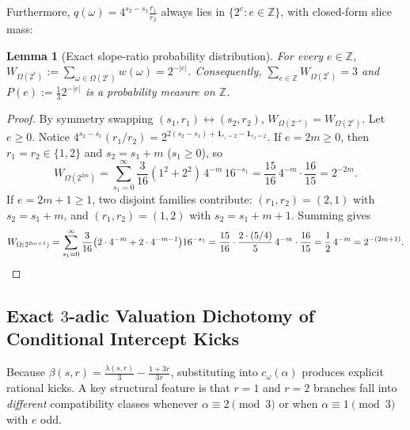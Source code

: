 \documentclass[11pt,a4paper]{article}
\numberwithin{equation}{section}
\newtheorem{lemma}[theorem]{Lemma}
\theoremstyle{definition}
\theoremstyle{remark}
\newcommand{\Z}{\mathbb{Z}}
\begin{document}
Furthermore, $q(\omega) = 4^{s_2 - s_1}\frac{r_1}{r_2}$ always lies in $\{2^e : e \in \Z\}$, with closed-form slice mass:

\begin{lemma}[Exact slope-ratio probability distribution]\label{lem:W_omega_2e}
For every $e \in \Z$, $W_{\Omega(2^e)} := \sum_{\omega \in \Omega(2^e)} w(\omega) = 2^{-|e|}$. Consequently, $\sum_{e \in \Z} W_{\Omega(2^e)} = 3$ and $P(e) := \frac{1}{3} 2^{-|e|}$ is a probability measure on $\Z$.
\end{lemma}

\begin{proof}
By symmetry swapping $(s_1, r_1) \leftrightarrow (s_2, r_2)$, $W_{\Omega(2^{-e})} = W_{\Omega(2^e)}$. Let $e \ge 0$. Notice $4^{s_2-s_1}(r_1/r_2) = 2^{2(s_2-s_1) + \mathbf{1}_{r_1=2} - \mathbf{1}_{r_2=2}}$.
If $e = 2m \ge 0$, then $r_1 = r_2 \in \{1, 2\}$ and $s_2 = s_1 + m$ ($s_1 \ge 0$), so
\[
W_{\Omega(2^{2m})} = \sum_{s_1=0}^\infty \frac{3}{16}(1^2 + 2^2)\, 4^{-m}\, 16^{-s_1} = \frac{15}{16}\,4^{-m}\cdot\frac{16}{15} = 2^{-2m}.
\]
If $e = 2m + 1 \ge 1$, two disjoint families contribute: $(r_1, r_2) = (2, 1)$ with $s_2 = s_1 + m$, and $(r_1, r_2) = (1, 2)$ with $s_2 = s_1 + m + 1$. Summing gives
\[
W_{\Omega(2^{2m+1})} = \sum_{s_1=0}^\infty \frac{3}{16}\bigl(2\cdot 4^{-m} + 2\cdot 4^{-m-1}\bigr)16^{-s_1} = \frac{15}{16}\cdot\frac{2\cdot(5/4)}{5}\,4^{-m}\cdot\frac{16}{15} = \frac{1}{2}\,4^{-m} = 2^{-(2m+1)}. \qedhere
\]
\end{proof}

\subsection{Exact $3$-adic Valuation Dichotomy of Conditional Intercept Kicks}\label{subsec:3adic_val}

Because $\beta(s, r) = \frac{\lambda(s, r)}{3} - \frac{1+3r}{3r}$, substituting into $c_\omega(\alpha)$ produces explicit rational kicks. A key structural feature is that $r = 1$ and $r = 2$ branches fall into \emph{different} compatibility classes whenever $\alpha \equiv 2 \pmod 3$ or when $\alpha \equiv 1 \pmod 3$ with $e$ odd.
\end{document}

